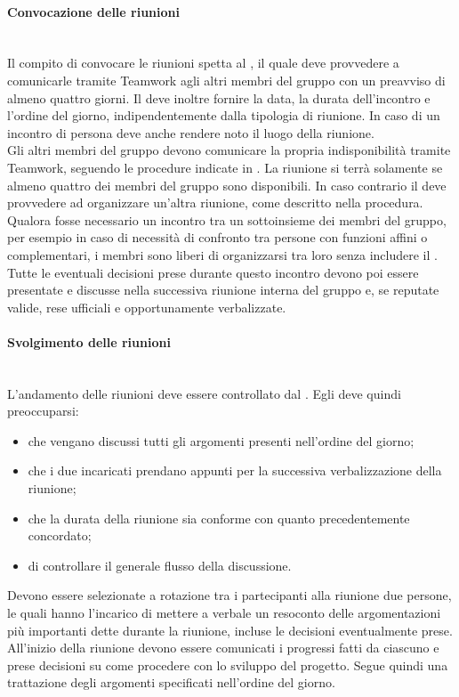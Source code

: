 \paragraph{Convocazione delle riunioni}\mbox{}\\
Il compito di convocare le riunioni spetta al \Responsabile, il quale deve provvedere a comunicarle tramite Teamwork agli altri membri del gruppo con un preavviso di almeno quattro giorni. Il \Responsabile{} deve inoltre fornire la data, la durata dell'incontro e l'ordine del giorno, indipendentemente dalla tipologia di riunione. In caso di un incontro di persona deve anche rendere noto il luogo della riunione.\\
Gli altri membri del gruppo devono comunicare la propria indisponibilità tramite Teamwork, seguendo le procedure indicate in . La riunione si terrà solamente se almeno quattro dei membri del gruppo sono disponibili. In caso contrario il \Responsabile{} deve provvedere ad organizzare un'altra riunione, come descritto nella procedura.\\
Qualora fosse necessario un incontro tra un sottoinsieme dei membri del gruppo, per esempio in caso di necessità di confronto tra persone con funzioni affini o complementari, i membri sono liberi di organizzarsi tra loro senza includere il \Responsabile. Tutte le eventuali decisioni prese durante questo incontro devono poi essere presentate e discusse nella successiva riunione interna del gruppo e, se reputate valide, rese ufficiali e opportunamente verbalizzate.

\paragraph{Svolgimento delle riunioni}\label{sec:svolgimento_riunioni_interne} \mbox{}\\
L'andamento delle riunioni deve essere controllato dal \Responsabile. Egli deve quindi preoccuparsi:

\begin{itemize}
	\item che vengano discussi tutti gli argomenti presenti nell'ordine del giorno;
	\item che i due incaricati prendano appunti per la successiva verbalizzazione della riunione;
	\item che la durata della riunione sia conforme con quanto precedentemente concordato;
	\item di controllare il generale flusso della discussione.
\end{itemize}
Devono essere selezionate a rotazione tra i partecipanti alla riunione due persone, le quali hanno l'incarico di mettere a verbale un resoconto delle argomentazioni più importanti dette durante la riunione, incluse le decisioni eventualmente prese. All'inizio della riunione devono essere comunicati i progressi fatti da ciascuno e prese decisioni su come procedere con lo sviluppo del progetto. Segue quindi una trattazione degli argomenti specificati nell'ordine del giorno. 

